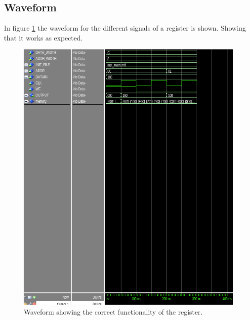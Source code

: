 \subsection*{Waveform}
In figure \ref{lab2:waveform} the waveform for the different signals of a 
register is shown. Showing that it works as expected.
\begin{figure}
  \caption{Waveform showing the correct functionality of the register.}
  \label{lab2:waveform}
  \centering
  \includegraphics[width=\textwidth]{lab2-waveform.png}
\end{figure}
